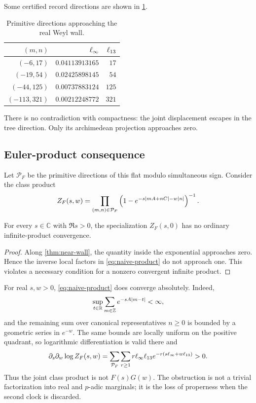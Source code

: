 Some certified record directions are shown in \cref{tab:wall}.

\begin{table}[ht]
\centering
\caption{Primitive directions approaching the real Weyl wall.}
\label{tab:wall}
\begin{tabular}{rrr}
\toprule
$(m,n)$ & $\ell_{\infty}$ & $\ell_{13}$\\
\midrule
$(-6,17)$ & $0.04113913165$ & $17$\\
$(-19,54)$ & $0.02425898145$ & $54$\\
$(-44,125)$ & $0.00737883124$ & $125$\\
$(-113,321)$ & $0.00212248772$ & $321$\\
\bottomrule
\end{tabular}
\end{table}

There is no contradiction with compactness: the joint displacement escapes
in the tree direction.  Only its archimedean projection approaches zero.

\subsection{Euler-product consequence}

Let $\mathcal P_F$ be the primitive directions of this flat modulo
simultaneous sign.  Consider the class product
\begin{equation}\label{eq:naive-product}
Z_F(s,w)=\prod_{(m,n)\in\mathcal P_F}
\left(1-e^{-s|mA+nC|-w|n|}\right)^{-1}.
\end{equation}

\begin{corollary}\label{cor:divergence}
For every $s\in\mathbb C$ with $\Re s>0$, the specialization $Z_F(s,0)$ has
no ordinary infinite-product convergence.
\end{corollary}

\begin{proof}
Along \cref{thm:near-wall}, the quantity inside the exponential approaches
zero.  Hence the inverse local factors in \eqref{eq:naive-product} do not
approach one.  This violates a necessary condition for a nonzero convergent
infinite product.
\end{proof}

For real $s,w>0$, \eqref{eq:naive-product} does converge absolutely.  Indeed,
\[
\sup_{t\in\mathbb{R}}\sum_{m\in\mathbb{Z}}e^{-sA|m-t|}<\infty,
\]
and the remaining sum over canonical representatives $n\ge0$ is bounded by
a geometric series in $e^{-w}$.  The same bounds are locally uniform on the
positive quadrant, so logarithmic differentiation is valid there and
\[
\partial_s\partial_w\log Z_F(s,w)
=\sum_{\mathcal P_F}\sum_{r\ge1}
r\ell_{\infty}\ell_{13} e^{-r(s\ell_{\infty}+w\ell_{13})}>0.
\]
Thus the joint class product is not $F(s)G(w)$.  The obstruction is not a
trivial factorization into real and $p$-adic marginals; it is the loss of
properness when the second clock is discarded.
